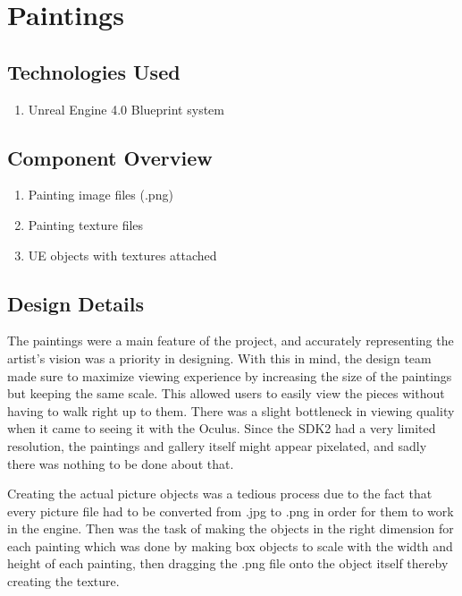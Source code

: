 \section{Paintings }

\subsection{Technologies  Used}
\begin{enumerate}
\item Unreal Engine 4.0 Blueprint system
\end{enumerate}

\subsection{Component  Overview}
\begin{enumerate}
\item Painting image files (.png)
\item Painting texture files
\item UE objects with textures attached
\end{enumerate}



\subsection{Design Details}
The paintings were a main feature of the project, and accurately representing the artist's vision was a priority in designing.  With this in mind, the design team made sure to maximize viewing experience by increasing the size of the paintings but keeping the same scale.  This allowed users to easily view the pieces without having to walk right up to them.  There was a slight bottleneck in viewing quality when it came to seeing it with the Oculus.  Since the SDK2 had a very limited resolution, the paintings and gallery itself might appear pixelated, and sadly there was nothing to be done about that.

Creating the actual picture objects was a tedious process due to the fact that every picture file had to be converted from .jpg to .png in order for them to work in the engine.  Then was the task of making the objects in the right dimension for each painting which was done by making box objects to scale with the width and height of each painting, then dragging the .png file onto the object itself thereby creating the texture.


